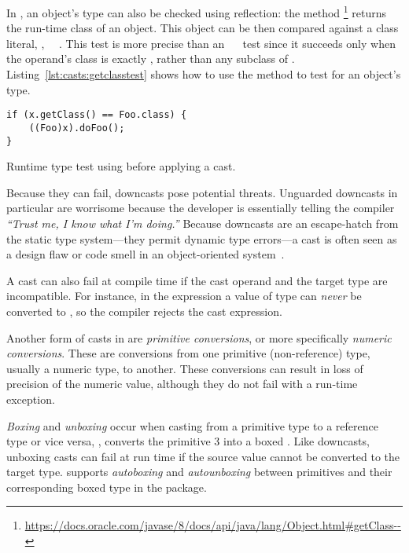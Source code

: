 In \java{}, an object's type can also be checked using reflection:
the  method%
\footnote{\url{https://docs.oracle.com/javase/8/docs/api/java/lang/Object.html\#getClass--}}
returns the run-time class of an object.
This  object can be then compared against a class literal, \eg,
~\code{==}~.
This test is more precise than an ~~ test since it succeeds only when the operand's class is exactly ,
rather than any subclass of .
Listing~\ref{lst:casts:getclasstest} shows how to use the  method to test for an object's type.

\begin{listing}
\begin{verbatim}
if (x.getClass() == Foo.class) {
	((Foo)x).doFoo(); 
}
\end{verbatim}
\caption{Runtime type test using  before applying a cast.}
\label{lst:casts:getclasstest}
\end{listing}

Because they can fail,
downcasts pose potential threats.
Unguarded downcasts in particular are
worrisome because the developer is essentially telling the compiler
\emph{``Trust me, I know what I'm doing.''}
Because downcasts are an escape-hatch from the static type system---they
permit dynamic type errors---a cast is often seen as a design flaw or code
smell in an object-oriented system~\citep{tufanoWhenWhyYour2015}.

A cast can also fail at compile time if the cast operand and the target type are incompatible.
For instance, in the expression  a value of type
 can \emph{never} be converted to , so the compiler
rejects the cast expression.

Another form of casts in \java{} are \emph{primitive conversions}, or more specifically
\emph{numeric conversions}. These are conversions from
one primitive (non-reference) type, usually a numeric type, to another. These conversions can result
in loss of precision of the numeric value, although they do not fail with a
run-time exception.

\emph{Boxing} and \emph{unboxing} occur when casting from a primitive type to
a reference type or vice versa, \eg,  converts the primitive
 3 into a boxed .
Like downcasts, unboxing casts can fail at
run time if the source value cannot be converted to the target type.
\java{} supports \emph{autoboxing} and \emph{autounboxing} between primitives and their corresponding
boxed type in the  package.


